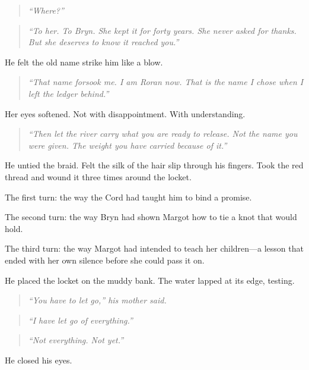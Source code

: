 \begin{quote}
\textit{``Where?''}
\end{quote}

\begin{quote}
\textit{``To her. To Bryn. She kept it for forty years. She never asked for thanks. But she deserves to know it reached you.''}
\end{quote}

He felt the old name strike him like a blow.

\begin{quote}
\textit{``That name forsook me. I am Roran now. That is the name I chose when I left the ledger behind.''}
\end{quote}

Her eyes softened. Not with disappointment. With understanding.

\begin{quote}
\textit{``Then let the river carry what you are ready to release. Not the name you were given. The weight you have carried because of it.''}
\end{quote}

\vspace{1em}

He untied the braid. Felt the silk of the hair slip through his fingers. Took the red thread and wound it three times around the locket.

The first turn: the way the Cord had taught him to bind a promise.

The second turn: the way Bryn had shown Margot how to tie a knot that would hold.

The third turn: the way Margot had intended to teach her children—a lesson that ended with her own silence before she could pass it on.

He placed the locket on the muddy bank. The water lapped at its edge, testing.

\begin{quote}
\textit{``You have to let go,'' his mother said.}
\end{quote}

\begin{quote}
\textit{``I have let go of everything.''}
\end{quote}

\begin{quote}
\textit{``Not everything. Not yet.''}
\end{quote}

He closed his eyes.

